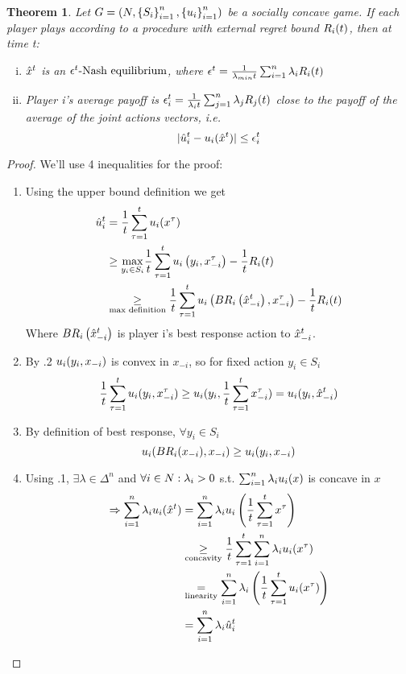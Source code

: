 \documentclass[11pt]{article}
\newtheorem{theorem}{Theorem}[section]
\theoremstyle{definition}
\theoremstyle{definition}
\begin{document}
\begin{theorem}
	Let $G = \left( N, \left\{ S_i \right\}_{i=1}^{n}, \left\{ u_i \right\}_{i=1}^{n} \right)$ be a socially concave game. If each player plays according to a procedure with external regret bound $R_i(t)$, then at time t:
	\begin{enumerate}[(i)]
		\item
			$\hat x^{t}$ is an $\epsilon^{t}\text{-Nash equilibrium}$, where $\epsilon^t = \frac{1}{\lambda_{min} t} \sum_{i=1}^n\lambda_i R_i(t)$
		\item
			Player i's average payoff is $\epsilon_i^t = \frac{1}{\lambda_i t} \sum_{j=1}^n \lambda_j R_j(t)$ close to the payoff of the average of the joint actions vectors, i.e.
			$$| \hat u^{t}_i - u_i(\hat x^{t})| \leq \epsilon_i^t$$
	\end{enumerate}
\end{theorem}
\begin{proof}
	We'll use 4 inequalities for the proof:
	\begin{enumerate}
		\item
			Using the upper bound definition we get
			\begin{align*}
				\hat u^{t}_i &= \frac{1}{t} \sum_{\tau=1}^t u_i(x^\tau)\\
					 &\geq \underset{y_i \in S_i}{\max} \frac{1}{t} \sum_{\tau=1}^t u_i\left( y_i, x_{-i}^\tau \right) - \frac{1}{t} R_i(t) \\
					 &\underset{\text{max definition}}{\geq} \frac{1}{t} \sum_{\tau=1}^t u_i\left( BR_i\left( \hat x^{t}_{-i} \right),x_{-i}^\tau \right) - \frac{1}{t} R_i(t)
			\end{align*}
			Where $BR_i\left( \hat x^{t}_{-i} \right)$ is player i's best response action to $\hat x^{t}_{-i}$.
		\item
			By .2 $u_i (y_i,x_{-i})$ is convex in $x_{-i}$, so for fixed action $y_i \in S_i$
			$$\frac{1}{t} \sum_{\tau=1}^t u_i (y_i,x_{-i}^\tau) \geq u_i (y_i,\frac{1}{t} \sum_{\tau=1}^t x_{-i}^\tau) = u_i (y_i,\hat x^{t}_{-i})$$
		\item
			By definition of best response, $\forall y_i \in S_i$
			$$u_i (BR_i(x_{-i}),x_{-i}) \geq u_i (y_i,x_{-i})$$
		\item
			Using .1, $\exists \lambda \in \Delta^n$ and $ \forall i \in N : \lambda_i > 0$ s.t. $\sum_{i=1}^n \lambda_i u_i(x)$ is concave in $x$
			\begin{align*}
				\Rightarrow \sum_{i=1}^n \lambda_i u_i(\hat x^{t}) & = \sum_{i=1}^n \lambda_i u_i \left( \frac{1}{t} \sum_{\tau=1}^t x^\tau \right)\\
								& \underset{\text{concavity}}{\geq} \frac{1}{t} \sum_{\tau=1}^t\sum_{i=1}^n \lambda_i u_i(x^\tau)\\
							       & \underset{\text{linearity}}{=} \sum_{i=1}^n \lambda_i \left( \frac{1}{t} \sum_{\tau=1}^t u_i(x^\tau) \right)\\
							       & = \sum_{i=1}^n \lambda_i \hat u^{t}_i
			\end{align*}
	\end{enumerate}


\end{proof}
\end{document}
